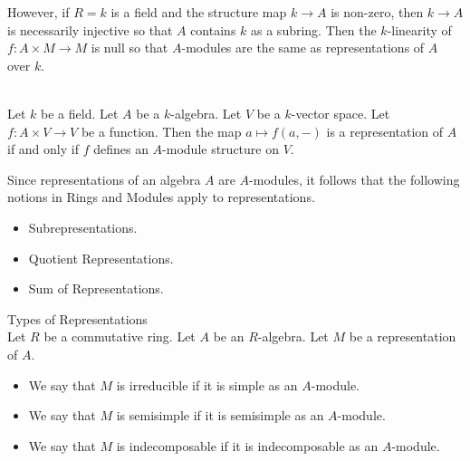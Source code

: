 \documentclass[a4paper]{article}
\begin{document}
However, if $R=k$ is a field and the structure map $k\to A$ is non-zero, then $k\to A$ is necessarily injective so that $A$ contains $k$ as a subring. Then the $k$-linearity of $f:A\times M\to M$ is null so that $A$-modules are the same as representations of $A$ over $k$. 

\begin{crl}{}{}\\
Let $k$ be a field. Let $A$ be a $k$-algebra. Let $V$ be a $k$-vector space. Let $f:A\times V\to V$ be a function. Then the map $a\mapsto f(a,-)$ is a representation of $A$ if and only if $f$ defines an $A$-module structure on $V$. 
\end{crl}

Since representations of an algebra $A$ are $A$-modules, it follows that the following notions in Rings and Modules apply to representations. 
\begin{itemize}
\item Subrepresentations. 
\item Quotient Representations. 
\item Sum of Representations. 
\end{itemize}

\begin{defn}{Types of Representations}{}\\
Let $R$ be a commutative ring. Let $A$ be an $R$-algebra. Let $M$ be a representation of $A$. 
\begin{itemize}
\item We say that $M$ is irreducible if it is simple as an $A$-module. 
\item We say that $M$ is semisimple if it is semisimple as an $A$-module. 
\item We say that $M$ is indecomposable if it is indecomposable as an $A$-module. 
\end{itemize}
\end{defn}
\end{document}
